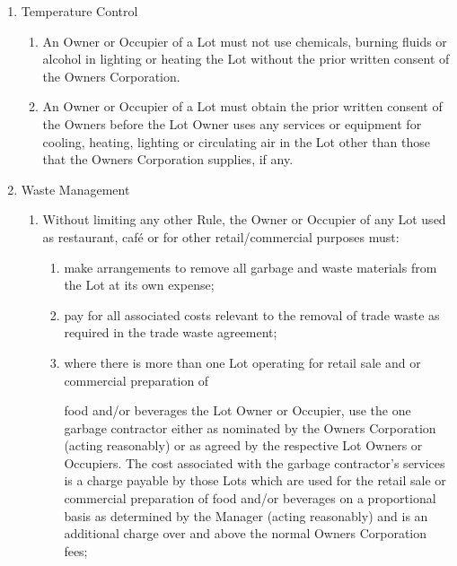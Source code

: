 \documentclass{article}
\begin{document}
\begin{enumerate}[label=\arabic*.]
\begin{enumerate}[label=\arabic{enumi}.\arabic*.]
\begin{enumerate}[label=\arabic{enumi}.\arabic*.]
\begin{enumerate}[label=(\arabic*)]
\end{enumerate}

\item  Temperature Control

\begin{enumerate}[label=(\arabic*)]

\item  An Owner or Occupier of a Lot must not use chemicals, burning fluids or alcohol in lighting or heating the Lot without the prior written consent of the Owners Corporation.

\item  An Owner or Occupier of a Lot must obtain the prior written consent of the Owners before the Lot Owner uses any services or equipment for cooling, heating, lighting or circulating air in the Lot other than those that the Owners Corporation supplies, if any.

\end{enumerate}

\item  Waste Management

\begin{enumerate}[label=(\arabic*)]

\item  Without limiting any other Rule, the Owner or Occupier of any Lot used as restaurant, café or for other retail/commercial purposes must:

\begin{enumerate}[label=(\alph*)]

\item  make arrangements to remove all garbage and waste materials from the Lot at its own expense;

\item  pay for all associated costs relevant to the removal of trade waste as required in the trade waste agreement;

\item  where there is more than one Lot operating for retail sale and or commercial preparation of
\newpage

food and/or beverages the Lot Owner or Occupier, use the one garbage contractor either as nominated by the Owners Corporation (acting reasonably) or as agreed by the respective Lot Owners or Occupiers. The cost associated with the garbage contractor’s services is a charge payable by those Lots which are used for the retail sale or commercial preparation of food and/or beverages on a proportional basis as determined by the Manager (acting reasonably) and is an additional charge over and above the normal Owners Corporation fees;


\end{enumerate}
\end{enumerate}
\end{enumerate}
\end{enumerate}
\end{enumerate}
\end{document}
